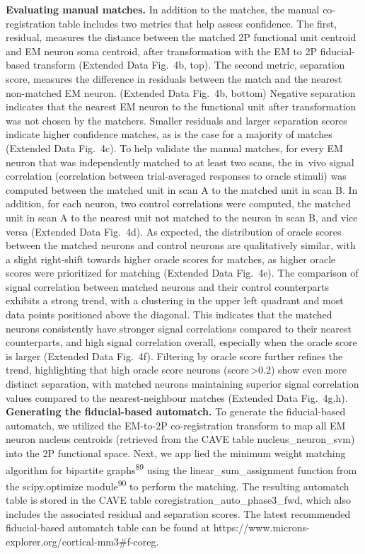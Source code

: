 \documentclass{article}
\begin{document}
\textbf{Evaluating manual matches.} In addition to the matches, the manual co-registration table includes two metrics that help assess confidence. The first, residual, measures the distance between the matched 2P functional unit centroid and EM neuron soma centroid, after transformation with the EM to 2P fiducial-based transform (Extended Data Fig.~4b, top). The second metric, separation score, measures the difference in residuals between the match and the nearest non-matched EM neuron. (Extended Data Fig.~4b, bottom) Negative separation indicates that the nearest EM neuron to the functional unit after transformation was not chosen by the matchers. Smaller residuals and larger separation scores indicate higher confidence matches, as is the case for a majority of matches (Extended Data Fig.~4c). To help validate the manual matches, for every EM neuron that was independently matched to at least two scans, the in~vivo signal correlation (correlation between trial-averaged responses to oracle stimuli) was computed between the matched unit in scan A to the matched unit in scan B. In addition, for each neuron, two control correlations were computed, the matched unit in scan A to the nearest unit not matched to the neuron in scan B, and vice versa (Extended Data Fig.~4d). As expected, the distribution of oracle scores between the matched neurons and control neurons are qualitatively similar, with a slight right-shift towards higher oracle scores for matches, as higher oracle scores were prioritized for matching (Extended Data Fig.~4e). The comparison of signal correlation between matched neurons and their control counterparts exhibits a strong trend, with a clustering in the upper left quadrant and most data points positioned above the diagonal. This indicates that the matched neurons consistently have stronger signal correlations compared to their nearest counterparts, and high signal correlation overall, especially when the oracle score is larger (Extended Data Fig.~4f). Filtering by oracle score further refines the trend, highlighting that high oracle score neurons (score\,>0.2) show even more distinct separation, with matched neurons maintaining superior signal correlation values compared to the nearest-neighbour matches (Extended Data Fig.~4g,h). \textbf{Generating the fiducial-based automatch.} To generate the fiducial-based automatch, we utilized the EM-to-2P co-registration transform to map all EM neuron nucleus centroids (retrieved from the CAVE table nucleus\_neuron\_svm) into the 2P functional space. Next, we app lied the minimum weight matching algorithm for bipartite graphs\textsuperscript{89} using the linear\_sum\_assignment function from the scipy.optimize module\textsuperscript{90} to perform the matching. The resulting automatch table is stored in the CAVE table coregistration\_auto\_phase3\_fwd, which also includes the associated residual and separation scores. The latest recommended fiducial-based automatch table can be found at https://www.microns-explorer.org/cortical-mm3\#f-coreg.
\end{document}
